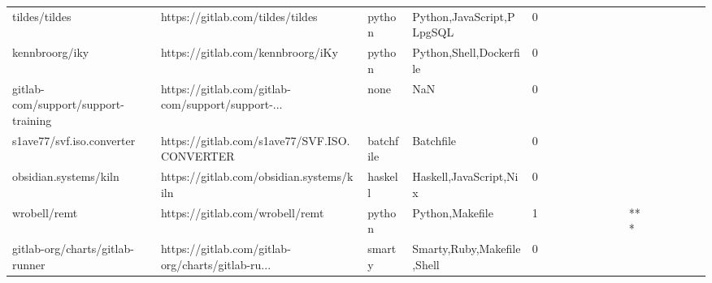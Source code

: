 \begin{tabular}{llllrlllllllllllll}
tildes/tildes                                      &                   https://gitlab.com/tildes/tildes &            python &                          Python,JavaScript,PLpgSQL &       0 &         &        &           &                &                 &        &           &           &          &          &       &              &          \\
kennbroorg/iky                                     &                  https://gitlab.com/kennbroorg/iKy &            python &                            Python,Shell,Dockerfile &       0 &         &        &           &                &                 &        &           &           &          &          &       &              &          \\
gitlab-com/support/support-training                &  https://gitlab.com/gitlab-com/support/support-... &              none &                                                NaN &       0 &         &        &           &                &                 &        &           &           &          &          &       &              &          \\
s1ave77/svf.iso.converter                          &       https://gitlab.com/s1ave77/SVF.ISO.CONVERTER &         batchfile &                                          Batchfile &       0 &         &        &           &                &                 &        &           &           &          &          &       &              &          \\
obsidian.systems/kiln                              &           https://gitlab.com/obsidian.systems/kiln &           haskell &                             Haskell,JavaScript,Nix &       0 &         &        &           &                &                 &        &           &           &          &          &       &              &          \\
wrobell/remt                                       &                    https://gitlab.com/wrobell/remt &            python &                                    Python,Makefile &       1 &         &        &           &                &                 &        &           &       *** &          &          &       &              &          \\
gitlab-org/charts/gitlab-runner                    &  https://gitlab.com/gitlab-org/charts/gitlab-ru... &            smarty &                         Smarty,Ruby,Makefile,Shell &       0 &         &        &           &                &                 &        &           &           &          &          &       &              &          \\

\end{tabular}
